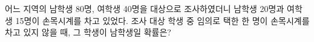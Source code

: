 어느 지역의 남학생 80명, 여학생 40명을 대상으로 조사하였더니 남학생 20명과 여학생 15명이 손목시계를 차고 있었다. 조사 대상 학생 중 임의로 택한 한 명이 손목시계를 차고 있지 않을 때, 그 학생이 남학생일 확률은?
